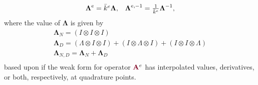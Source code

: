 \begin{definition}
\begin{equation}
\begin{array}{c c}
\boldsymbol{\Lambda}^e = \bar{k}^e \boldsymbol{\Lambda},  &  \boldsymbol{\Lambda}^{e, -1} = \frac{1}{\bar{k}^e} \boldsymbol{\Lambda}^{-1},
\end{array}
\end{equation}
where the value of $\mathbf{\Lambda}$ is given by
\begin{equation}
\begin{array}{c}
\boldsymbol{\Lambda}_N      = \left( I \otimes I \otimes I \right)  \\
\boldsymbol{\Lambda}_D      = \left( \Lambda \otimes I \otimes I\right) + \left( I \otimes \Lambda \otimes I\right) + \left( I \otimes I \otimes \Lambda \right)  \\
\boldsymbol{\Lambda}_{N, D} = \boldsymbol{\Lambda}_N + \boldsymbol{\Lambda}_D  \\
\end{array}
\end{equation}
based upon if the weak form for operator ${\color{burgundy}\mathbf{A}}^e$ has interpolated values, derivatives, or both, respectively, at quadrature points.
\end{definition}